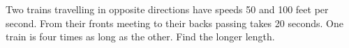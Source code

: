 Two trains travelling in opposite directions have speeds 50 and 100 feet per second. From their fronts meeting to their backs passing takes 20 seconds. One train is four times as long as the other. Find the longer length.
